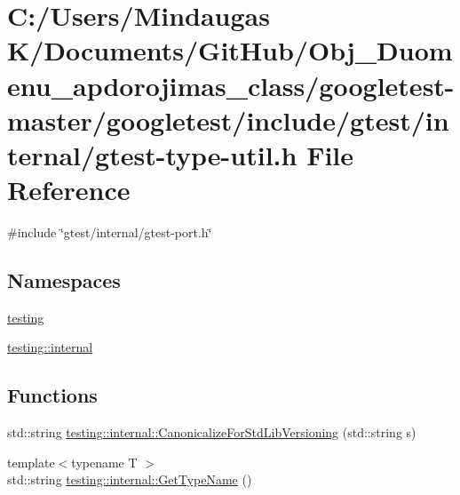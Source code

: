 \hypertarget{googletest-master_2googletest_2include_2gtest_2internal_2gtest-type-util_8h}{}\section{C\+:/\+Users/\+Mindaugas K/\+Documents/\+Git\+Hub/\+Obj\+\_\+\+Duomenu\+\_\+apdorojimas\+\_\+class/googletest-\/master/googletest/include/gtest/internal/gtest-\/type-\/util.h File Reference}
\label{googletest-master_2googletest_2include_2gtest_2internal_2gtest-type-util_8h}
{\ttfamily \#include \char`\"{}gtest/internal/gtest-\/port.\+h\char`\"{}}\newline
\subsection*{Namespaces}
\begin{DoxyCompactItemize}
\item 
 \mbox{\hyperlink{namespacetesting}{testing}}
\item 
 \mbox{\hyperlink{namespacetesting_1_1internal}{testing\+::internal}}
\end{DoxyCompactItemize}
\subsection*{Functions}
\begin{DoxyCompactItemize}
\item 
std\+::string \mbox{\hyperlink{namespacetesting_1_1internal_a5342e843f087081705094beae07b557b}{testing\+::internal\+::\+Canonicalize\+For\+Std\+Lib\+Versioning}} (std\+::string s)
\item 
{\footnotesize template$<$typename T $>$ }\\std\+::string \mbox{\hyperlink{namespacetesting_1_1internal_a635606b4731f843c86ec8ca51cab83a1}{testing\+::internal\+::\+Get\+Type\+Name}} ()
\end{DoxyCompactItemize}
